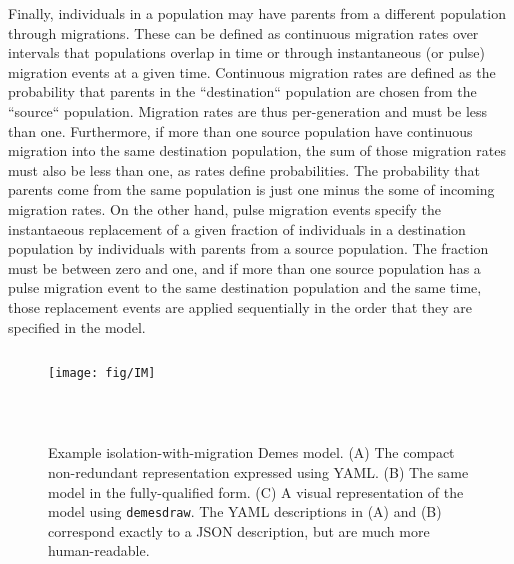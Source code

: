 \documentclass[11pt]{article}
\begin{document}
Finally, individuals in a population may have parents from a different
population through migrations. These can be defined as continuous migration
rates over intervals that populations overlap in time or through instantaneous
(or pulse) migration events at a given time. Continuous migration rates are
defined as the probability that parents in the ``destination`` population are
chosen from the ``source`` population.  Migration rates are thus per-generation
and must be less than one. Furthermore, if more than one source population have
continuous migration into the same destination population, the sum of those
migration rates must also be less than one, as rates define probabilities. The
probability that parents come from the same population is just one minus the
some of incoming migration rates. On the other hand, pulse migration events
specify the instantaeous replacement of a given fraction of individuals in a
destination population by individuals with parents from a source population.
The fraction must be between zero and one, and if more than one source
population has a pulse migration event to the same destination population and
the same time, those replacement events are applied sequentially in the order
that they are specified in the model.

\begin{figure}
\begin{minipage}{0.48\textwidth}
\begin{tcolorbox}
\inputminted[fontsize=\scriptsize,linenos,numbersep=5pt]{yaml}{models/IM.yaml}
\end{tcolorbox}
\begin{tcolorbox}
\texttt{[image: fig/IM]}
\end{tcolorbox}
\end{minipage}\hfill
\begin{minipage}{0.48\textwidth}
\begin{tcolorbox}
\inputminted[fontsize=\scriptsize,linenos,numbersep=5pt]{yaml}{models/IM-resolved.yaml}
\end{tcolorbox}
\end{minipage}\\
\caption{\label{fig-example}
Example isolation-with-migration Demes model. (A) The compact non-redundant
representation expressed using YAML. (B) The same model in the fully-qualified
form. (C) A visual representation of the model using \texttt{demesdraw}.
The YAML descriptions in (A) and (B) correspond exactly to a JSON description,
but are much more human-readable.
}
\end{figure}
\end{document}
